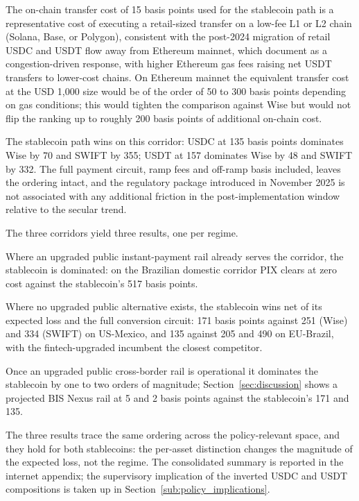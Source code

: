The on-chain transfer cost of 15 basis points used for the stablecoin path is a representative cost of executing a retail-sized transfer on a low-fee L1 or L2 chain (Solana, Base, or Polygon), consistent with the post-2024 migration of retail USDC and USDT flow away from Ethereum mainnet, which \citet{klee_etal_2026_fragility} document as a congestion-driven response, with higher Ethereum gas fees raising net USDT transfers to lower-cost chains. On Ethereum mainnet the equivalent transfer cost at the USD 1,000 size would be of the order of 50 to 300 basis points depending on gas conditions; this would tighten the comparison against Wise but would not flip the ranking up to roughly 200 basis points of additional on-chain cost.

The stablecoin path wins on this corridor: USDC at 135 basis points dominates Wise by 70 and SWIFT by 355; USDT at 157 dominates Wise by 48 and SWIFT by 332. The full payment circuit, ramp fees and off-ramp basis included, leaves the ordering intact, and the regulatory package introduced in November 2025 is not associated with any additional friction in the post-implementation window relative to the secular trend.

The three corridors yield three results, one per regime.

\begin{result}\label{res:dominated}
Where an upgraded public instant-payment rail already serves the corridor, the stablecoin is dominated: on the Brazilian domestic corridor PIX clears at zero cost against the stablecoin's 517 basis points.
\end{result}

\begin{result}\label{res:wins}
Where no upgraded public alternative exists, the stablecoin wins net of its expected loss and the full conversion circuit: 171 basis points against 251 (Wise) and 334 (SWIFT) on US-Mexico, and 135 against 205 and 490 on EU-Brazil, with the fintech-upgraded incumbent the closest competitor.
\end{result}

\begin{result}\label{res:absorbed}
Once an upgraded public cross-border rail is operational it dominates the stablecoin by one to two orders of magnitude; Section~\ref{sec:discussion} shows a projected BIS Nexus rail at 5 and 2 basis points against the stablecoin's 171 and 135.
\end{result}

The three results trace the same ordering across the policy-relevant space, and they hold for both stablecoins: the per-asset distinction changes the magnitude of the expected loss, not the regime. The consolidated summary is reported in the internet appendix; the supervisory implication of the inverted USDC and USDT compositions is taken up in Section~\ref{sub:policy_implications}.
